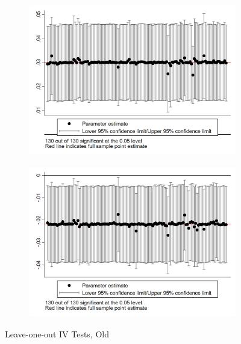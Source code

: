 \documentclass{article}
\begin{document}
\begin{figure}[htbp]
    \begin{subfigure}{0.3\textwidth}
        \includegraphics[width=\linewidth]{exhibits_old/figures/exogeneity_tests/loo_iv_gen_town.png}
        \label{fig:sub4}
    \end{subfigure}
    \begin{subfigure}{0.3\textwidth}
        \includegraphics[width=\linewidth]{exhibits_old/figures/exogeneity_tests/loo_iv_spdist.png}
        \label{fig:sub5}
    \end{subfigure}
    \caption{Leave-one-out IV Tests, Old}
    \label{fig:all}
\end{figure}
\clearpage
\end{document}
